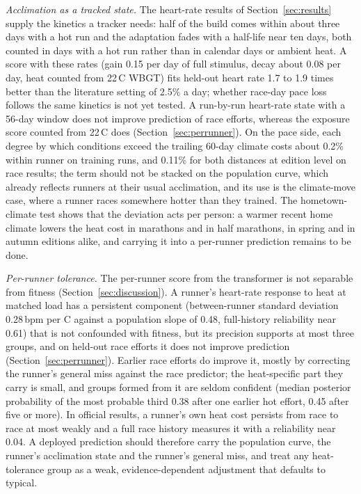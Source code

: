 \documentclass[11pt]{article}
\renewcommand{\_}{\textunderscore\allowbreak}
\begin{document}
\emph{Acclimation as a tracked state.} The heart-rate results of Section~\ref{sec:results} supply the kinetics a tracker needs: half of the build comes within about three days with a hot run and the adaptation fades with a half-life near ten days, both counted in days with a hot run rather than in calendar days or ambient heat. A score with these rates (gain 0.15 per day of full stimulus, decay about 0.08 per day, heat counted from 22\,\textdegree C WBGT) fits held-out heart rate 1.7 to 1.9 times better than the literature setting of 2.5\% a day; whether race-day pace loss follows the same kinetics is not yet tested. A run-by-run heart-rate state with a 56-day window does not improve prediction of race efforts, whereas the exposure score counted from 22\,\textdegree C does (Section~\ref{sec:perrunner}). On the pace side, each degree by which conditions exceed the trailing 60-day climate costs about 0.2\% within runner on training runs, and 0.11\% for both distances at edition level on race results; the term should not be stacked on the population curve, which already reflects runners at their usual acclimation, and its use is the climate-move case, where a runner races somewhere hotter than they trained. The hometown-climate test shows that the deviation acts per person: a warmer recent home climate lowers the heat cost in marathons and in half marathons, in spring and in autumn editions alike, and carrying it into a per-runner prediction remains to be done.

\emph{Per-runner tolerance.} The per-runner score from the transformer is not separable from fitness (Section~\ref{sec:discussion}). A runner's heart-rate response to heat at matched load has a persistent component (between-runner standard deviation 0.28\,bpm per \textdegree C against a population slope of 0.48, full-history reliability near 0.61) that is not confounded with fitness, but its precision supports at most three groups, and on held-out race efforts it does not improve prediction (Section~\ref{sec:perrunner}). Earlier race efforts do improve it, mostly by correcting the runner's general miss against the race predictor; the heat-specific part they carry is small, and groups formed from it are seldom confident (median posterior probability of the most probable third 0.38 after one earlier hot effort, 0.45 after five or more). In official results, a runner's own heat cost persists from race to race at most weakly and a full race history measures it with a reliability near 0.04. A deployed prediction should therefore carry the population curve, the runner's acclimation state and the runner's general miss, and treat any heat-tolerance group as a weak, evidence-dependent adjustment that defaults to typical.
\end{document}
